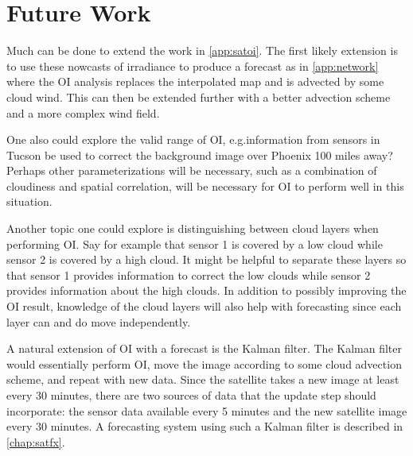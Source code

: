 \section{Future Work}
Much can be done to extend the work in \cref{app:satoi}.
The first likely extension is to use these nowcasts of irradiance to
produce a forecast as in \cref{app:network} where the OI analysis
replaces the interpolated map and is advected by some cloud wind.
This can then be extended further with a better advection scheme and
a more complex wind field.

One also could explore the valid range of OI, e.g.\@can information
from sensors in Tucson be used to correct the background image over
Phoenix 100 miles away?
Perhaps other parameterizations will be necessary, such as a
combination of cloudiness and spatial correlation, will be necessary
for OI to perform well in this situation.

Another topic one could explore is distinguishing between cloud layers
when performing OI.
Say for example that sensor 1 is covered by a low cloud while sensor 2
is covered by a high cloud.
It might be helpful to separate these layers so that sensor 1 provides
information to correct the low clouds while sensor 2 provides
information about the high clouds.
In addition to possibly improving the OI result, knowledge of the
cloud layers will also help with forecasting since each layer can and
do move independently.

A natural extension of OI with a forecast is the Kalman filter.
The Kalman filter would essentially perform OI, move the image
according to some cloud advection scheme, and repeat with new data.
Since the satellite takes a new image at least every 30 minutes, there
are two sources of data that the update step should incorporate: the
sensor data available every 5 minutes and the new satellite image
every 30 minutes.
A forecasting system using such a Kalman filter is described in
\cref{chap:satfx}.

